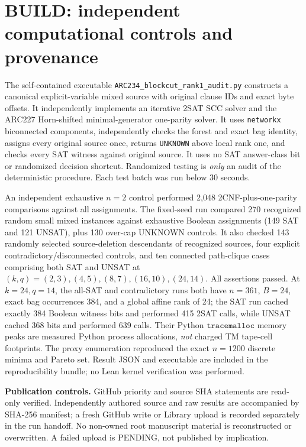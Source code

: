 \documentclass[10pt]{article}
\begin{document}
\section{BUILD: independent computational controls and provenance}
The self-contained executable \texttt{ARC234\_blockcut\_rank1\_audit.py} constructs a canonical explicit-variable mixed source with original clause IDs and exact byte offsets. It independently implements an iterative 2SAT SCC solver and the ARC227 Horn-shifted minimal-generator one-parity solver. It uses \texttt{networkx} biconnected components, independently checks the forest and exact bag identity, assigns every original source once, returns \texttt{UNKNOWN} above local rank one, and checks every SAT witness against original source. It uses no SAT answer-class bit or randomized decision shortcut. Randomized testing is \emph{only} an audit of the deterministic procedure. Each test batch was run below 30 seconds.

An independent exhaustive $n=2$ control performed 2,048 2CNF-plus-one-parity comparisons against all assignments. The fixed-seed run compared 270 recognized random small mixed instances against exhaustive Boolean assignments (149 SAT and 121 UNSAT), plus 130 over-cap UNKNOWN controls. It also checked 143 randomly selected source-deletion descendants of recognized sources, four explicit contradictory/disconnected controls, and ten connected path-clique cases comprising both SAT and UNSAT at $(k,q)=(2,3),(4,5),(8,7),(16,10),(24,14)$. All assertions passed. At $k=24,q=14$, the all-SAT and contradictory runs both have $n=361$, $B=24$, exact bag occurrences 384, and a global affine rank of 24; the SAT run cached exactly 384 Boolean witness bits and performed 415 2SAT calls, while UNSAT cached 368 bits and performed 639 calls. Their Python $\texttt{tracemalloc}$ memory peaks are measured Python process allocations, \emph{not} charged TM tape-cell footprints. The proxy enumeration reproduced the exact $n=1200$ discrete minima and Pareto set. Result JSON and executable are included in the reproducibility bundle; no Lean kernel verification was performed.

\noindent\textbf{Publication controls.} GitHub priority and source SHA statements are read-only verified. Independently authored source and raw results are accompanied by SHA-256 manifest; a fresh GitHub write or Library upload is recorded separately in the run handoff. No non-owned root manuscript material is reconstructed or overwritten. A failed upload is PENDING, not published by implication.
\end{document}
